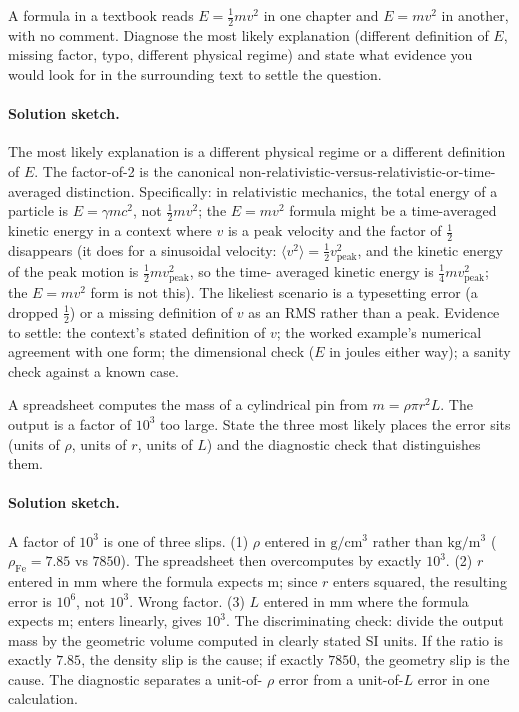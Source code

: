 \begin{exercise}
A formula in a textbook reads $E = \tfrac{1}{2} m v^{2}$ in one
chapter and $E = m v^{2}$ in another, with no comment. Diagnose
the most likely explanation (different definition of $E$, missing
factor, typo, different physical regime) and state what evidence
you would look for in the surrounding text to settle the question.

\paragraph{Solution sketch.}
The most likely explanation is a different physical regime or a
different definition of $E$. The factor-of-2 is the canonical
non-relativistic-versus-relativistic-or-time-averaged distinction.
Specifically: in relativistic mechanics, the total energy of a
particle is $E = \gamma m c^{2}$, not $\tfrac{1}{2} m v^{2}$; the
$E = m v^{2}$ formula might be a time-averaged kinetic energy in a
context where $v$ is a peak velocity and the factor of $\tfrac{1}{2}$
disappears (it does for a sinusoidal velocity: $\langle v^{2} \rangle
= \tfrac{1}{2} v_{\text{peak}}^{2}$, and the kinetic energy of the
peak motion is $\tfrac{1}{2} m v_{\text{peak}}^{2}$, so the time-
averaged kinetic energy is $\tfrac{1}{4} m v_{\text{peak}}^{2}$;
the $E = m v^{2}$ form is not this). The likeliest scenario is a
typesetting error (a dropped $\tfrac{1}{2}$) or a missing definition
of $v$ as an RMS rather than a peak. Evidence to settle: the
context's stated definition of $v$; the worked example's numerical
agreement with one form; the dimensional check ($E$ in joules
either way); a sanity check against a known case.
\end{exercise}

\begin{exercise}
A spreadsheet computes the mass of a cylindrical pin from $m = \rho
\pi r^{2} L$. The output is a factor of $10^{3}$ too large. State
the three most likely places the error sits (units of $\rho$, units
of $r$, units of $L$) and the diagnostic check that distinguishes
them.

\paragraph{Solution sketch.}
A factor of $10^{3}$ is one of three slips. (1) $\rho$ entered in
$\si{\gram\per\centi\meter\cubed}$ rather than $\si{\kilogram\per
\meter\cubed}$ ($\rho_{\text{Fe}} = 7.85$ vs $7850$). The
spreadsheet then overcomputes by exactly $10^{3}$. (2) $r$ entered
in $\si{\milli\meter}$ where the formula expects $\si{\meter}$;
since $r$ enters squared, the resulting error is $10^{6}$, not
$10^{3}$. Wrong factor. (3) $L$ entered in $\si{\milli\meter}$
where the formula expects $\si{\meter}$; enters linearly, gives
$10^{3}$. The discriminating check: divide the output mass by the
geometric volume computed in clearly stated SI units. If the ratio
is exactly $7.85$, the density slip is the cause; if exactly $7850$,
the geometry slip is the cause. The diagnostic separates a unit-of-
$\rho$ error from a unit-of-$L$ error in one calculation.
\end{exercise}

